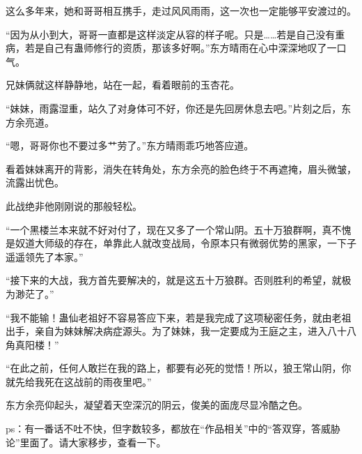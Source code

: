 \begin{this_body}
这么多年来，她和哥哥相互携手，走过风风雨雨，这一次也一定能够平安渡过的。

“因为从小到大，哥哥一直都是这样淡定从容的样子呢。只是……若是自己没有重病，若是自己有蛊师修行的资质，那该多好啊。”东方晴雨在心中深深地叹了一口气。

兄妹俩就这样静静地，站在一起，看着眼前的玉杏花。

“妹妹，雨露湿重，站久了对身体可不好，你还是先回房休息去吧。”片刻之后，东方余亮道。

“嗯，哥哥你也不要过多艹劳了。”东方晴雨乖巧地答应道。

看着妹妹离开的背影，消失在转角处，东方余亮的脸色终于不再遮掩，眉头微皱，流露出忧色。

此战绝非他刚刚说的那般轻松。

“一个黑楼兰本来就不好对付了，现在又多了一个常山阴。五十万狼群啊，真不愧是奴道大师级的存在，单靠此人就改变战局，令原本只有微弱优势的黑家，一下子遥遥领先了本家。”

“接下来的大战，我方首先要解决的，就是这五十万狼群。否则胜利的希望，就极为渺茫了。”

“我不能输！蛊仙老祖好不容易答应下来，若是我完成了这项秘密任务，就由老祖出手，亲自为妹妹解决病症源头。为了妹妹，我一定要成为王庭之主，进入八十八角真阳楼！”

“在此之前，任何人敢拦在我的路上，都要有必死的觉悟！所以，狼王常山阴，你就先给我死在这战前的雨夜里吧。”

东方余亮仰起头，凝望着天空深沉的阴云，俊美的面庞尽显冷酷之色。

ps：有一番话不吐不快，但字数较多，都放在“作品相关”中的“答双穿，答威胁论”里面了。请大家移步，查看一下。

\end{this_body}

